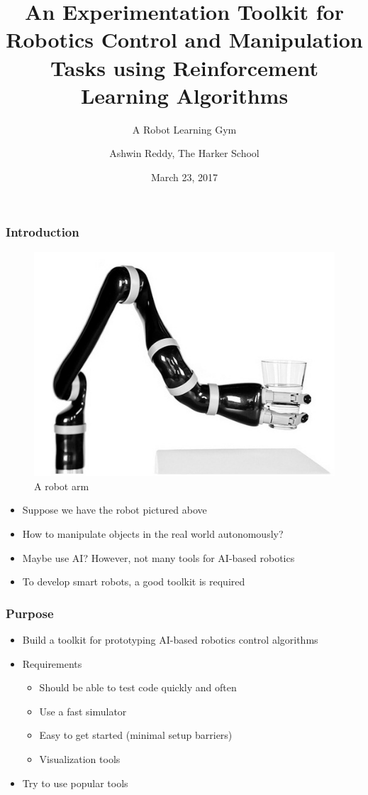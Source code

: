\documentclass[handout]{beamer}
\title{An Experimentation Toolkit for Robotics Control and Manipulation Tasks using Reinforcement Learning Algorithms}
\subtitle{A Robot Learning Gym}
\author{Ashwin Reddy, The Harker School}
\date %
{March 23, 2017}
\begin{document}
\frame{\titlepage}
\begin{frame}
    \frametitle{Introduction}
    \begin{figure}
        \includegraphics[scale=0.2]{arm}
        \caption{A robot arm}
    \end{figure}
    \begin{itemize}
        \item{Suppose we have the robot pictured above}
        \item{How to manipulate objects in the real world autonomously?}
        \item{Maybe use AI? However, not many tools for AI-based robotics}
        \item{To develop smart robots, a good toolkit is required}
    \end{itemize}
\end{frame}
\begin{frame}
    \frametitle{Purpose}
    \begin{itemize}
        \item{Build a toolkit for prototyping AI-based robotics control algorithms}
        \item{Requirements}
        \begin{itemize}
            \item{Should be able to test code quickly and often}
            \item{Use a fast simulator}
            \item{Easy to get started (minimal setup barriers)}
            \item{Visualization tools}
        \end{itemize}
        \item{Try to use popular tools}
    \end{itemize}
\end{frame}
\end{document}
